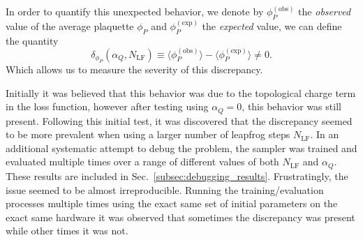 \documentclass[../main.tex]{subfiles}
\begin{document}
%
In order to quantify this unexpected behavior, we denote by $\phi_{P}^{(\mathrm{obs})}$ the \emph{observed} value of
the average plaquette $\phi_{P}$ and $\phi_{P}^{(\mathrm{exp})}$ the \emph{expected} value, we can define the quantity
% 
\begin{equation}
  {\delta_{\phi_P}(\alpha_Q, N_{\mathrm{LF}}) \equiv \langle \phi_P^{\mathrm{(obs)}}\rangle 
  - \langle{\phi_{P}^{\mathrm{(exp)}}}\rangle \neq 0}.
\end{equation}
%
Which allows us to measure the severity of this discrepancy.%
%
%

Initially it was believed that this behavior was due to the topological charge term in the loss function, however after
testing using $\alpha_{Q} = 0$, this behavior was still present.
%
Following this initial test, it was discovered that the discrepancy seemed to be more prevalent when using a larger
number of leapfrog steps $N_{\mathrm{LF}}$.
%
In an additional systematic attempt to debug the problem, the sampler was trained and evaluated multiple times over a
range of different values of both $N_{\mathrm{LF}}$ and $\alpha_{Q}$.
%
These results are included in Sec.~\ref{subsec:debugging_results}.
%
Frustratingly, the issue seemed to be almost irreproducible.
%
Running the training/evaluation processes multiple times using the exact same set of initial parameters on the exact
same hardware it was observed that sometimes the discrepancy was present while other times it was not.
%
%

\end{document}
